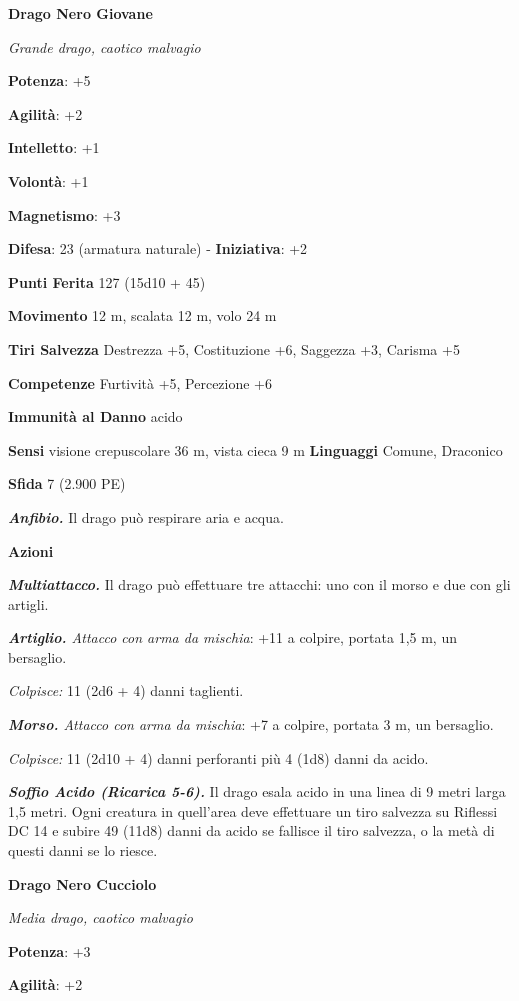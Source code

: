 \begin{multicols}{2}
\textbf{Drago Nero Giovane}

\emph{Grande drago, caotico malvagio}

\textbf{Potenza}: +5

\textbf{Agilità}: +2

\textbf{Intelletto}: +1

\textbf{Volontà}: +1

\textbf{Magnetismo}: +3

\textbf{Difesa}: 23 (armatura naturale) - \textbf{Iniziativa}: +2

\textbf{Punti Ferita} 127 (15d10 + 45)

\textbf{Movimento} 12 m, scalata 12 m, volo 24 m

\textbf{Tiri Salvezza} Destrezza +5, Costituzione +6, Saggezza +3,
Carisma +5

\textbf{Competenze} Furtività +5, Percezione +6

\textbf{Immunità al Danno} acido

\textbf{Sensi} visione crepuscolare 36 m, vista cieca 9 m
\textbf{Linguaggi} Comune, Draconico

\textbf{Sfida} 7 (2.900 PE)

\emph{\textbf{Anfibio.}} Il drago può respirare aria e acqua.

\textbf{Azioni}

\emph{\textbf{Multiattacco.}} Il drago può effettuare tre attacchi: uno
con il morso e due con gli artigli.

\emph{\textbf{Artiglio.} Attacco con arma da mischia}: +11 a colpire,
portata 1,5 m, un bersaglio.

\emph{Colpisce:} 11 (2d6 + 4) danni taglienti.

\emph{\textbf{Morso.} Attacco con arma da mischia}: +7 a colpire,
portata 3 m, un bersaglio.

\emph{Colpisce:} 11 (2d10 + 4) danni perforanti più 4 (1d8) danni da
acido.

\emph{\textbf{Soffio Acido (Ricarica 5-6).}} Il drago esala acido in una
linea di 9 metri larga 1,5 metri. Ogni creatura in quell'area deve
effettuare un tiro salvezza su Riflessi DC 14 e subire 49 (11d8) danni
da acido se fallisce il tiro salvezza, o la metà di questi danni se lo
riesce.

\textbf{Drago Nero Cucciolo}

\emph{Media drago, caotico malvagio}

\textbf{Potenza}: +3

\textbf{Agilità}: +2


\end{multicols}
